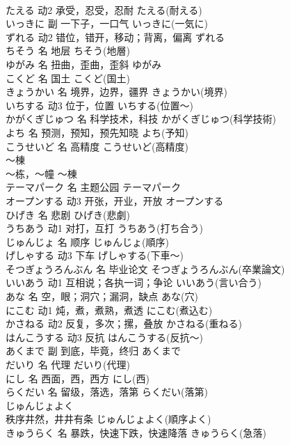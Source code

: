 \documentclass[8pt]{extreport}
\begin{document}
\begin{CJK}{UTF8}{min}
\\	たえる	动2	承受，忍受，忍耐	たえる(耐える)	
\\	いっきに	副	一下子，一口气	いっきに(一気に)	
\\	ずれる	动2	错位，错开，移动；背离，偏离	ずれる	
\\	ちそう	名	地层	ちそう(地層)	
\\	ゆがみ	名	扭曲，歪曲，歪斜	ゆがみ	
\\	こくど	名	国土	こくど(国土)	
\\	きょうかい	名	境界，边界，疆界	きょうかい(境界)	
\\	いちする	动3	位于，位置	いちする(位置～)	
\\	かがくぎじゅつ	名	科学技术，科技	かがくぎじゅつ(科学技術)	
\\	よち	名	预测，预知，预先知晓	よち(予知)	
\\	こうせいど	名	高精度	こうせいど(高精度)	
\\	～棟	
\\	～栋，～幢	～棟	
\\	テーマパーク	名	主题公园	テーマパーク	
\\	オープンする	动3	开张，开业，开放	オープンする	
\\	ひげき	名	悲剧	ひげき(悲劇)	
\\	うちあう	动1	对打，互打	うちあう(打ち合う)	
\\	じゅんじょ	名	顺序	じゅんじょ(順序)	
\\	げしゃする	动3	下车	げしゃする(下車～)	
\\	そつぎょうろんぶん	名	毕业论文	そつぎょうろんぶん(卒業論文)	
\\	いいあう	动1	互相说；各执一词；争论	いいあう(言い合う)	
\\	あな	名	空，眼；洞穴；漏洞，缺点	あな(穴)	
\\	にこむ	动1	炖，煮，煮熟，煮透	にこむ(煮込む)	
\\	かさねる	动2	反复，多次；摞，叠放	かさねる(重ねる)	
\\	はんこうする	动3	反抗	はんこうする(反抗～)	
\\	あくまで	副	到底，毕竟，终归	あくまで	
\\	だいり	名	代理	だいり(代理)	
\\	にし	名	西面，西，西方	にし(西)	
\\	らくだい	名	留级，落选，落第	らくだい(落第)	
\\	じゅんじょよく	
\\	秩序井然，井井有条	じゅんじょよく(順序よく)	
\\	きゅうらく	名	暴跌，快速下跌，快速降落	きゅうらく(急落)	

\end{CJK}
\end{document}
